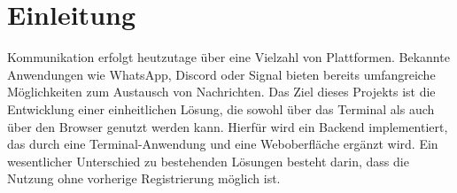 \chapter{Einleitung}

Kommunikation erfolgt heutzutage über eine Vielzahl von Plattformen. Bekannte Anwendungen wie WhatsApp, Discord oder Signal bieten bereits umfangreiche Möglichkeiten zum Austausch von Nachrichten.
Das Ziel dieses Projekts ist die Entwicklung einer einheitlichen Lösung, die sowohl über das Terminal als auch über den Browser genutzt werden kann. Hierfür wird ein Backend implementiert, das durch eine Terminal-Anwendung und eine Weboberfläche ergänzt wird.
Ein wesentlicher Unterschied zu bestehenden Lösungen besteht darin, dass die Nutzung ohne vorherige Registrierung möglich ist.
